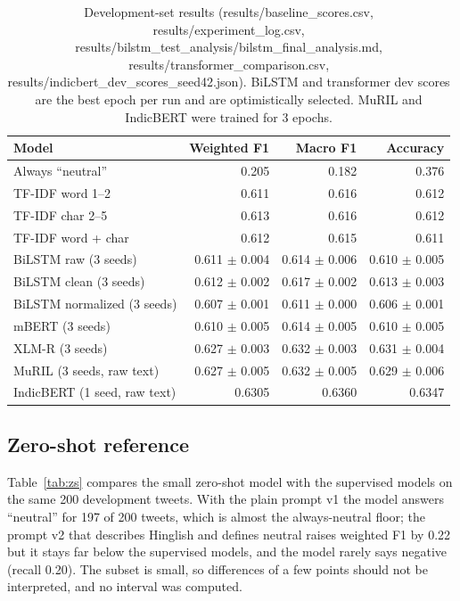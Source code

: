 \documentclass{nle}
\begin{document}
\begin{table}
\centering
\caption{Development-set results (results/baseline\_scores.csv, results/experiment\_log.csv, results/bilstm\_test\_analysis/bilstm\_final\_analysis.md,
results/transformer\_comparison.csv, results/indicbert\_dev\_scores\_seed42.json). BiLSTM and transformer dev scores are the best epoch per run and are optimistically selected. MuRIL and IndicBERT were trained for 3 epochs.}
\label{tab:dev}
\footnotesize\setlength{\tabcolsep}{3pt}
\begin{tabular}{lrrr}
\hline\hline
Model & Weighted F1 & Macro F1 & Accuracy \\
\hline
Always ``neutral'' & 0.205 & 0.182 & 0.376 \\
TF-IDF word 1--2 & 0.611 & 0.616 & 0.612 \\
TF-IDF char 2--5 & 0.613 & 0.616 & 0.612 \\
TF-IDF word + char & 0.612 & 0.615 & 0.611 \\
BiLSTM raw (3 seeds) & 0.611 $\pm$ 0.004 & 0.614 $\pm$ 0.006 & 0.610 $\pm$ 0.005 \\
BiLSTM clean (3 seeds) & 0.612 $\pm$ 0.002 & 0.617 $\pm$ 0.002 & 0.613 $\pm$ 0.003 \\
BiLSTM normalized (3 seeds) & 0.607 $\pm$ 0.001 & 0.611 $\pm$ 0.000 & 0.606 $\pm$ 0.001 \\
mBERT (3 seeds) & 0.610 $\pm$ 0.005 & 0.614 $\pm$ 0.005 & 0.610 $\pm$ 0.005 \\
XLM-R (3 seeds) & 0.627 $\pm$ 0.003 & 0.632 $\pm$ 0.003 & 0.631 $\pm$ 0.004 \\
MuRIL (3 seeds, raw text) & 0.627 $\pm$ 0.005 & 0.632 $\pm$ 0.005 & 0.629 $\pm$ 0.006 \\
IndicBERT (1 seed, raw text) & 0.6305 & 0.6360 & 0.6347 \\
\hline\hline
\end{tabular}
\end{table}

\subsection{Zero-shot reference}
Table~\ref{tab:zs} compares the small zero-shot model with the supervised models on the same 200 development tweets. With the
plain prompt v1 the model answers ``neutral'' for 197 of 200 tweets, which is almost the always-neutral floor; the prompt v2
that describes Hinglish and defines neutral raises weighted F1 by 0.22 but it stays far below the supervised models, and the
model rarely says negative (recall 0.20). The subset is small, so differences of a few points should not be interpreted, and no
interval was computed.
\end{document}

